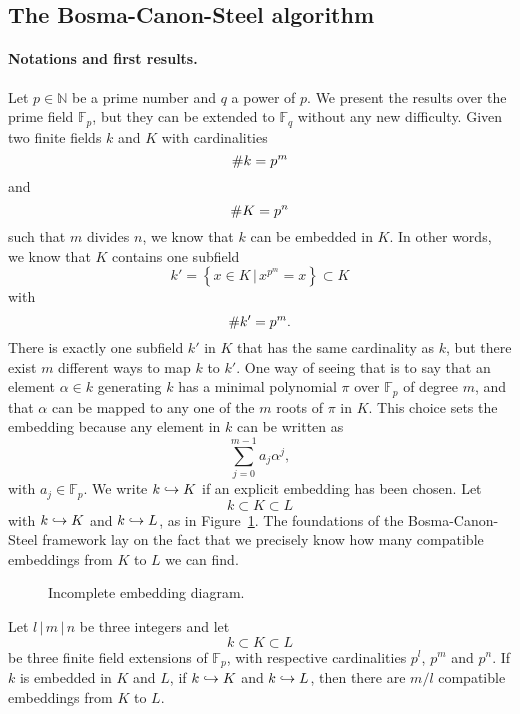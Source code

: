\subsection{The Bosma-Canon-Steel algorithm}
\label{sec:bcs-alg}
\paragraph{Notations and first results.} Let $p\in\mathbb{N}$ be a prime number
and $q$ a power of $p$. We present the results over the prime field
$\mathbb{F}_p$, but they can be extended to $\mathbb{F}_q$ without any new
difficulty. Given two finite fields $k$ and $K$ with cardinalities
\[
  \# k = p^m
\]
and
\[
  \# K =  p^n
\]
such that $m$ divides $n$, we know that $k$ can be embedded in $K$. In other
words, we know that $K$ contains one subfield
\[
  k'=\left\{ x\in K\,|\,x^{p^m}=x \right\}\subset K
\]
with 
\[
  \# k' = p^m.
\]
There is exactly one subfield $k'$ in $K$ that has the same cardinality as $k$,
but there exist $m$ different ways to map $k$ to $k'$. One way of seeing that is
to say that an element $\alpha\in k$ generating $k$ has a minimal polynomial
$\pi$ over $\mathbb{F}_p$ of degree $m$, and that $\alpha$ can be mapped to any
one of the $m$ roots of $\pi$ in $K$. This choice sets the embedding because any
element in $k$ can be written as
\[
  \sum_{j=0}^{m-1}a_j \alpha^j,
\]
with $a_j\in\mathbb{F}_p$. We write $k\hookrightarrow K$ if an explicit embedding has been
chosen. Let
\[
  k\subset K\subset L
\]
with $k\hookrightarrow K$ and $k\hookrightarrow L$, as in Figure~\ref{fig:incomplete}. The foundations
of the Bosma-Canon-Steel framework lay on the fact that we precisely know how many
compatible embeddings from $K$ to $L$ we can find.
\begin{figure}%
  \centering
\caption{Incomplete embedding diagram.}
\label{fig:incomplete}
\end{figure}
\begin{prop}
  \label{prop:number-embeddings}
  Let $l\,|\,m\,|\,n$ be three integers and let
  \[
    k\subset K\subset L
  \]
  be three finite field extensions of $\mathbb{F}_p$, with respective
  cardinalities $p^l$, $p^m$ and $p^n$. If $k$ is embedded in $K$ and $L$,
  \ie if $k\hookrightarrow K$ and $k\hookrightarrow L$, then there are $m/l$ compatible embeddings
  from $K$ to $L$.
\end{prop}
